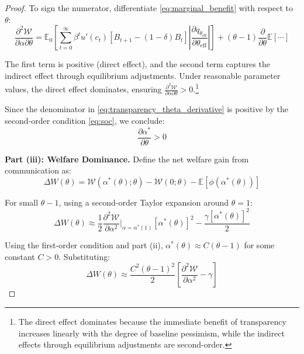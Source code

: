 \documentclass[12pt]{article}
\theoremstyle{plain}
\begin{document}
\begin{proof}
	To sign the numerator, differentiate \eqref{eq:marginal_benefit} with respect
	to $\theta$:
	\begin{equation}
		\frac{\partial^2 \mathcal{W}}{\partial \alpha \partial \theta} = \mathbb{E}_0 \left[ \sum_{t=0}^\infty \beta^t u'(c_t) [B_{t+1} - (1-\delta)B_t] \left|\frac{\partial q_{\theta_{\text{eff}}}}{\partial \theta_{\text{eff}}}\right| \right] + (\theta-1) \frac{\partial}{\partial \theta} \mathbb{E}[\cdots] \label{eq:cross_derivative}
	\end{equation}

	The first term is positive (direct effect), and the second term captures the
	indirect effect through equilibrium adjustments. Under reasonable parameter
	values, the direct effect dominates, ensuring $\frac{\partial^2
			\mathcal{W}}{\partial \alpha \partial \theta} > 0$.\footnote{The direct effect
		dominates because the immediate benefit of transparency increases linearly with
		the degree of baseline pessimism, while the indirect effects through
		equilibrium adjustments are second-order.}

	Since the denominator in \eqref{eq:transparency_theta_derivative} is positive
	by the second-order condition \eqref{eq:soc}, we conclude:
	\begin{equation}
		\frac{\partial
			\alpha^*}{\partial \theta} > 0 \label{eq:transparency_increasing}
	\end{equation}

	\textbf{Part (iii): Welfare Dominance.}
	Define the net welfare gain from communication as:
	\begin{equation}
		\Delta W(\theta) = \mathcal{W}(\alpha^*(\theta); \theta) - \mathcal{W}(0; \theta) - \mathbb{E}[\phi(\alpha^*(\theta))] \label{eq:welfare_gain}
	\end{equation}

	For small $\theta-1$, using a second-order Taylor expansion around $\theta =
		1$:
	\begin{equation}
		\Delta W(\theta) \approx \frac{1}{2} \frac{\partial^2 \mathcal{W}}{\partial \alpha^2}\bigg|_{\alpha=\alpha^*(1)} [\alpha^*(\theta)]^2 - \frac{\gamma [\alpha^*(\theta)]^2}{2} \label{eq:welfare_expansion}
	\end{equation}

	Using the first-order condition and part (ii), $\alpha^*(\theta) \approx
		C(\theta-1)$ for some constant $C > 0$. Substituting:
	\begin{equation}
		\Delta W(\theta) \approx \frac{C^2(\theta-1)^2}{2} \left[ \frac{\partial^2 \mathcal{W}}{\partial \alpha^2} - \gamma \right] \label{eq:welfare_approximation}
	\end{equation}


\end{proof}
\end{document}
